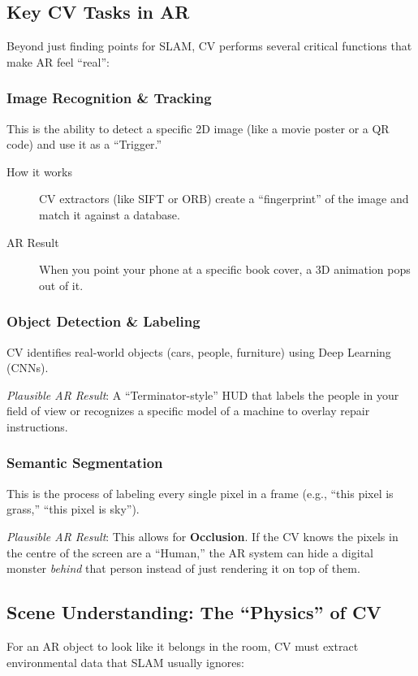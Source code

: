 \documentclass[11pt]{article}
\begin{document}
\subsection{Key CV Tasks in AR}
\label{sec:orgb796748}
Beyond just finding points for SLAM, CV performs
several critical functions that make AR feel ``real'':
\subsubsection{Image Recognition \& Tracking}
\label{sec:orgceb66ee}
This is the ability to detect a specific 2D image (like
a movie poster or a QR code) and use it as a ``Trigger.''
\begin{description}
\item[{How it works}] CV extractors (like SIFT or ORB)
create a ``fingerprint'' of the image and match it
against a database.
\item[{AR Result}] When you point your phone at a specific
book cover, a 3D animation pops out of it.
\end{description}
\subsubsection{Object Detection \& Labeling}
\label{sec:org01a0b94}
CV identifies real-world objects (cars, people,
furniture) using Deep Learning (CNNs).

\emph{Plausible AR Result}: A ``Terminator-style'' HUD that
labels the people in your field of view or recognizes a
specific model of a machine to overlay repair
instructions.
\subsubsection{Semantic Segmentation}
\label{sec:org9d490bf}
This is the process of labeling every single pixel in a
frame (e.g., ``this pixel is grass,'' ``this pixel is
sky'').

\emph{Plausible AR Result}: This allows for \textbf{Occlusion}.  If
the CV knows the pixels in the centre of the screen are
a ``Human,'' the AR system can hide a digital monster
\emph{behind} that person instead of just rendering it on
top of them.
\subsection{Scene Understanding: The ``Physics'' of CV}
\label{sec:org61b4548}
For an AR object to look like it belongs in the room,
CV must extract environmental data that SLAM usually
ignores:
\end{document}

